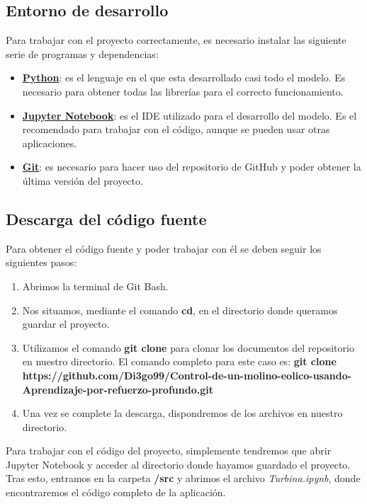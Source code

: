 \subsection{Entorno de desarrollo}

Para trabajar con el proyecto correctamente, es necesario instalar las siguiente serie de programas y dependencias:

\begin{itemize}
    \item \textbf{\href{https://www.python.org/downloads/}{Python}}: es el lenguaje en el que esta desarrollado casi todo el modelo. Es necesario para obtener todas las librerías para el correcto funcionamiento.
    \item \textbf{\href{https://jupyter.org/install}{Jupyter Notebook}}: es el IDE utilizado para el desarrollo del modelo. Es el recomendado para trabajar con el código, aunque se pueden usar otras aplicaciones.
     \item \textbf{\href{https://git-scm.com/book/en/v2/Getting-Started-Installing-Git}{Git}}: es necesario para hacer uso del repositorio de GitHub y poder obtener la última versión del proyecto.
\end{itemize}

\subsection{Descarga del código fuente}

Para obtener el código fuente y poder trabajar con él se deben seguir los siguientes pasos:

\begin{enumerate}
    \item Abrimos la terminal de Git Bash.
    \item Nos situamos, mediante el comando \textbf{cd}, en el directorio donde queramos guardar el proyecto.
    \item Utilizamos el comando \textbf{git clone} para clonar los documentos del repositorio en nuestro directorio. El comando completo para este caso es: \textbf{git clone https://github.com/Di3go99/Control-de-un-molino-eolico-usando-Aprendizaje-por-refuerzo-profundo.git}
    \item Una vez se complete la descarga, dispondremos de los archivos en nuestro directorio.
\end{enumerate}

Para trabajar con el código del proyecto, simplemente tendremos que abrir Jupyter Notebook y acceder al directorio donde hayamos guardado el proyecto. Tras esto, entramos en la carpeta \textbf{/src} y abrimos el archivo \textit{Turbina.ipynb}, donde encontraremos el código completo de la aplicación.


